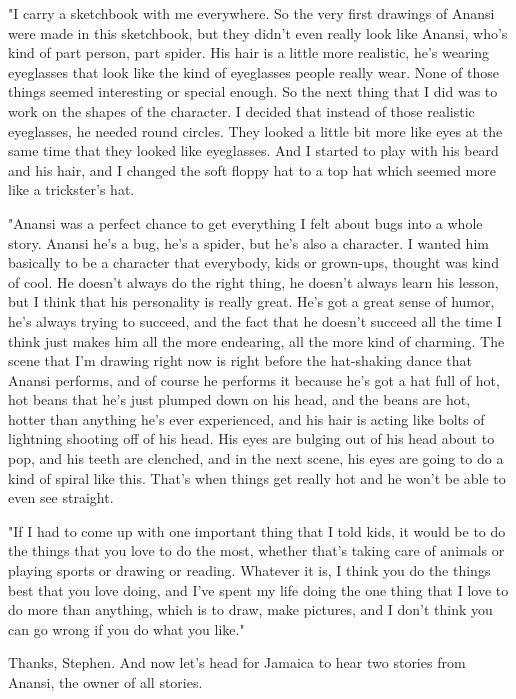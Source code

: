 "I carry a sketchbook with me everywhere. So the very first drawings of Anansi were made in this sketchbook, but they didn't even really look like Anansi, who's kind of part person, part spider. His hair is a little more realistic, he's wearing eyeglasses that look like the kind of eyeglasses people really wear. None of those things seemed interesting or special enough. So the next thing that I did was to work on the shapes of the character. I decided that instead of those realistic eyeglasses, he needed round circles. They looked a little bit more like eyes at the same time that they looked like eyeglasses. And I started to play with his beard and his hair, and I changed the soft floppy hat to a top hat which seemed more like a trickster's hat.

"Anansi was a perfect chance to get everything I felt about bugs into a whole story. Anansi he's a bug, he's a spider, but he's also a character. I wanted him basically to be a character that everybody, kids or grown-ups, thought was kind of cool. He doesn't always do the right thing, he doesn't always learn his lesson, but I think that his personality is really great. He's got a great sense of humor, he's always trying to succeed, and the fact that he doesn't succeed all the time I think just makes him all the more endearing, all the more kind of charming. The scene that I'm drawing right now is right before the hat-shaking dance that Anansi performs, and of course he performs it because he's got a hat full of hot, hot beans that he's just plumped down on his head, and the beans are hot, hotter than anything he's ever experienced, and his hair is acting like bolts of lightning shooting off of his head. His eyes are bulging out of his head about to pop, and his teeth are clenched, and in the next scene, his eyes are going to do a kind of spiral like this. That's when things get really hot and he won't be able to even see straight.

"If I had to come up with one important thing that I told kids, it would be to do the things that you love to do the most, whether that's taking care of animals or playing sports or drawing or reading. Whatever it is, I think you do the things best that you love doing, and I've spent my life doing the one thing that I love to do more than anything, which is to draw, make pictures, and I don't think you can go wrong if you do what you like."

Thanks, Stephen. And now let's head for Jamaica to hear two stories from Anansi, the owner of all stories.

